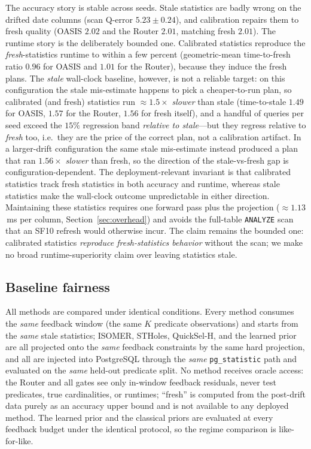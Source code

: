 The accuracy story is stable across seeds. Stale statistics are badly wrong on the
drifted date columns (scan Q-error $5.23\pm0.24$), and calibration repairs them to
fresh quality (OASIS $2.02$ and the Router $2.01$, matching fresh $2.01$). The
runtime story is the deliberately bounded one. Calibrated statistics reproduce the
\emph{fresh}-statistics runtime to within a few percent (geometric-mean
time-to-fresh ratio $0.96$ for OASIS and $1.01$ for the Router), because they
induce the fresh plans. The \emph{stale} wall-clock baseline, however, is not a
reliable target: on this configuration the stale mis-estimate happens to pick a
cheaper-to-run plan, so calibrated (and fresh) statistics run $\approx 1.5\times$
\emph{slower} than stale (time-to-stale $1.49$ for OASIS, $1.57$ for the Router,
$1.56$ for fresh itself), and a handful of queries per seed exceed the $15\%$
regression band \emph{relative to stale}---but they regress relative to
\emph{fresh} too, i.e.\ they are the price of the correct plan, not a calibration
artifact. In a larger-drift configuration the same stale mis-estimate instead
produced a plan that ran $1.56\times$ \emph{slower} than fresh, so the direction of
the stale-vs-fresh gap is configuration-dependent. The deployment-relevant
invariant is that calibrated statistics track fresh statistics in both accuracy and
runtime, whereas stale statistics make the wall-clock outcome unpredictable in
either direction. Maintaining these statistics requires one forward pass plus the
projection ($\approx 1.13$\,ms per column, Section~\ref{sec:overhead}) and avoids
the full-table \texttt{ANALYZE} scan that an SF10 refresh would otherwise incur.
The claim remains the bounded one: calibrated statistics \emph{reproduce
fresh-statistics behavior} without the scan; we make no broad
runtime-superiority claim over leaving statistics stale.

\subsection{Baseline fairness}
\label{sec:mr-fairness}

All methods are compared under identical conditions. Every method consumes the
\emph{same} feedback window (the same $K$ predicate observations) and starts from
the \emph{same} stale statistics; ISOMER, STHoles, QuickSel-H, and the learned
prior are all projected onto the \emph{same} feedback constraints by the same
hard projection, and all are injected into PostgreSQL through the \emph{same}
\texttt{pg\_statistic} path and evaluated on the \emph{same} held-out predicate
split. No method receives oracle access: the Router and all gates see only
in-window feedback residuals, never test predicates, true cardinalities, or
runtimes; ``fresh'' is computed from the post-drift data purely as an accuracy
upper bound and is not available to any deployed method. The learned prior and
the classical priors are evaluated at every feedback budget under the identical
protocol, so the regime comparison is like-for-like.

